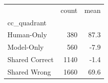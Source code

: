 \begin{tabular}{lrr}
\toprule
 & count & mean \\
cc_quadrant &  &  \\
\midrule
Human-Only & 380 & 87.3 \\
Model-Only & 560 & -7.9 \\
Shared Correct & 1140 & -1.4 \\
Shared Wrong & 1660 & 69.6 \\
\bottomrule
\end{tabular}
